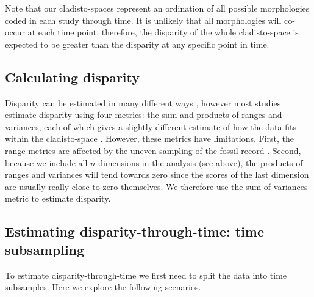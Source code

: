 \documentclass[12pt,a4paper]{article}
\begin{document}
Note that our cladisto-spaces represent an ordination of all possible morphologies coded in each study through time.
It is unlikely that all morphologies will co-occur at each time point, therefore, the disparity of the whole cladisto-space is expected to be greater than the disparity at any specific point in time.

\subsection{Calculating disparity}
\label{disparity_calc}
Disparity can be estimated in many different ways \citep[e.g.][]{Wills1994,Ciampaglio2004,thorneresetting2011,hopkinsdecoupling2013,huang2015origins}, however most studies estimate disparity using four metrics: the sum and products of ranges and variances, each of which gives a slightly different estimate of how the data fits within the cladisto-space \citep{Foote01071994,Wills1994,brusatte50,Brusatte12092008,cisneros2010,thorneresetting2011,prentice2011,brusattedinosaur2012,toljagictriassic-jurassic2013,ruta2013,bentonmodels2014,bensonfaunal2014}.
However, these metrics have limitations. 
First, the range metrics are affected by the uneven sampling of the fossil record \citep{Butler2012}.
Second, because we include all $n$ dimensions in the analysis (see above), the products of ranges and variances will tend towards zero since the scores of the last dimension are usually really close to zero themselves. 
We therefore use the sum of variances metric to estimate disparity.

\subsection{Estimating disparity-through-time: time subsampling} 
\label{time_subsamples}

To estimate disparity-through-time we first need to split the data into time subsamples.
Here we explore the following scenarios.
\end{document}
